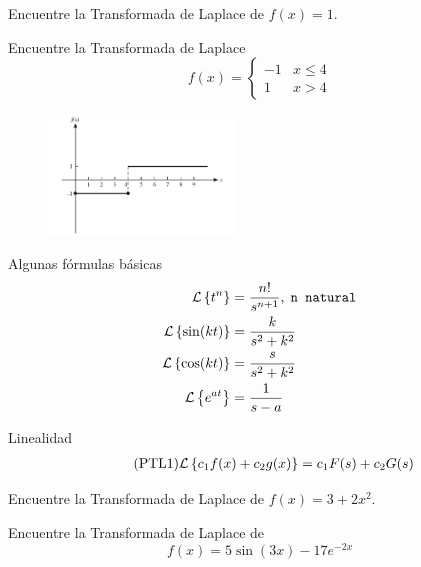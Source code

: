  \begin{resuelto}
  \label{bron:exmp:21.4}
  Encuentre la Transformada de Laplace de
  $f(x)=1.$
 \end{resuelto}




 \begin{resuelto}
  \label{bron:exmp:21.9}
  Encuentre la Transformada de Laplace
  $$f(x)=\begin{cases}
     -1 & x\leq 4\\
     1 & x>4
    \end{cases}
$$
 \end{resuelto}




 \begin{figure}
 \centering
 \includegraphics[width=5cm,keepaspectratio=true]{./edo/img0401.png}
 \label{fig:0401}
\end{figure}


{Algunas fórmulas básicas}
\begin{align}
 \label{lap:11}
 \mathcal{L}\left\{ t^{n} \right\} &= \dfrac{n!}{s^{n+1}}, \; \texttt{n natural} \\
 \label{lap:13}
 \mathcal{L}\left\{ \sin(kt) \right\}&=\dfrac{k}{s^2+k^2} \\
 \label{lap:14}
 \mathcal{L}\left\{ \cos(kt) \right\}&=\dfrac{s}{s^2+k^2} \\
 \label{lap:15}
 \mathcal{L}\left\{ e^{at} \right\}&=\frac{1}{s-a}
\end{align}



{Linealidad}
\begin{align}
  \label{bron:21.3}
  \tag{PTL1}
  \mathcal{L}\left\{ c_{1}f(x)+c_{2}g(x) \right\}=c_{1}F(s)+c_{2}G(s)
\end{align}



 \begin{resuelto}
 \label{bron:exmp:21.10}
 Encuentre la Transformada de Laplace de $f(x)=3+2x^{2}.$
 \end{resuelto}



 \begin{resuelto}
  \label{bron:exmp:21.11}
  Encuentre la Transformada de Laplace de
  $$f(x)=5\sin(3x)-17e^{-2x}$$
 \end{resuelto}




